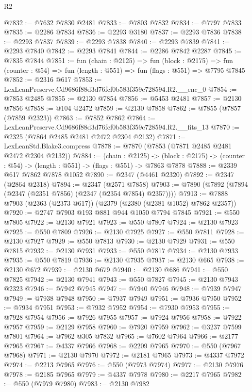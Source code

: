 \begin{lexlean}{R2}
\begin{coremodule}
@7832 := @7632 @7830 @2481
@7833 := @7803 @7832
@7834 := @7797 @7833
@7835 := @2286 @7834
@7836 := @2293 @3180
@7837 := @2293 @7836
@7838 := @2293 @7837
@7839 := @2293 @7838
@7840 := @2293 @7839
@7841 := @2293 @7840
@7842 := @2293 @7841
@7844 := @2286 @7842 @2287
@7845 := @7835 @7844
@7851 := fun (chain : @2125) =>
  fun (block : @2175) =>
  fun (counter : @54) => fun (length : @551) => fun (flags : @551) => @7795 @7845
@7852 := @2316 @617
@7853 := LexLeanPreserve.Cd9686f88d3d76fcf0b583f359c728594.R2.__enc_0
@7854 := @7853 @2485
@7855 := @2130 @7854
@7856 := @5453 @2481
@7857 := @2130 @7856
@7858 := @104 @2472
@7859 := @2130 @7858
@7862 := @7855 (@7857 (@7859 @2323))
@7863 := @7852 @7862
@7864 := LexLeanPreserve.Cd9686f88d3d76fcf0b583f359c728594.R2.__fits_13
@7870 := @2325 (@7864 @2485 @2481 @2472 @2304 @2132)
@7871 := LexLeanStd.Blake3.compress
@7878 := @7870 (@7853 (@7871 @2485 @2481 @2472 @2304 @2132))
@7884 := (chain : @2125) ->
  (block : @2175) -> (counter : @54) -> (length : @551) -> (flags : @551) -> @7863 @7878
@7888 := @2339 @617 @7862 @7878 @1052
@7890 := @2347 (@4461 @2320)
@7892 := @2347 (@2864 @2318)
@7894 := @2347 (@2571 @7858)
@7903 := @7890 (@7892 (@7894 (@2347 (@2351 @7856) (@2347 (@2354 @7854) @2357))))
@7913 := @7888 @7903 (@2363 (@2373 @617)) (@2379 (@2380 (@2381 @1052) @7862 @2357))
@7920 := @2747 @7903 @193 @881 @944 @1050 @7794 @7845
@7921 := @550 @7805
@7922 := @2130 @7921
@7923 := @550 @7807
@7924 := @2130 @7923
@7925 := @550 @7809
@7926 := @2130 @7925
@7927 := @550 @7811
@7928 := @2130 @7927
@7929 := @550 @7813
@7930 := @2130 @7929
@7931 := @550 @7815
@7932 := @2130 @7931
@7933 := @550 @7817
@7934 := @2130 @7933
@7935 := @550 @7819
@7936 := @2130 @7935
@7937 := @2130 @665
@7938 := @2130 @672
@7939 := @2130 @679
@7940 := @2130 @686
@7941 := @550 @7825
@7942 := @2130 @7941
@7943 := @550 @7827
@7945 := @2130 @7943 @2323
@7946 := @7942 @7945
@7947 := @7940 @7946
@7948 := @7939 @7947
@7949 := @7938 @7948
@7950 := @7937 @7949
@7951 := @7936 @7950
@7952 := @7934 @7951
@7953 := @7932 @7952
@7954 := @7930 @7953
@7955 := @7928 @7954
@7956 := @7926 @7955
@7957 := @7924 @7956
@7958 := @7922 @7957
@7959 := @2129 @7958
@7960 := @7920 @7959
@7962 := @3237 @7599 @7801
@7964 := @7962 @305 @7832
@7965 := @7602 @7964
@7966 := @2177 @7965
@7967 := @4337 @7966
@7968 := @2209 @7965
@7970 := @550 (@7967 @7968)
@7971 := @2130 @7970
@7972 := @2181 @7965
@7973 := @4337 @7972
@7974 := @2213 @7965
@7976 := @550 (@7973 @7974)
@7977 := @2130 @7976
@7978 := @2185 @7965
@7979 := @4337 @7978
@7980 := @2217 @7965
@7982 := @550 (@7979 @7980)
@7983 := @2130 @7982

\end{coremodule}
\end{lexlean}

